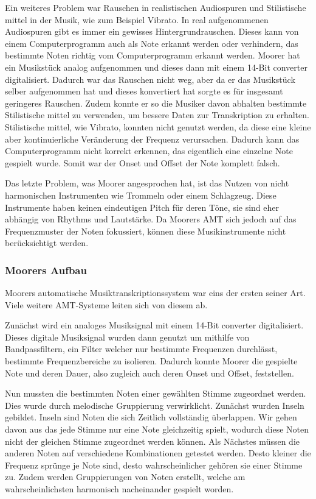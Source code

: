 Ein weiteres Problem war Rauschen in realistischen Audiospuren und
Stilistische mittel in der Musik, wie zum Beispiel Vibrato.
In real aufgenommenen Audiospuren gibt es immer ein gewisses Hintergrundrauschen.
\cite{iZotope2025noisefloor}
Dieses kann von einem Computerprogramm auch als Note erkannt werden oder verhindern, das bestimmte Noten
richtig vom Computerprogramm erkannt werden.
Moorer hat ein Musikstück analog aufgenommen und dieses dann mit einem 14-Bit converter digitalisiert.
Dadurch war das Rauschen nicht weg, aber da er das Musikstück selber aufgenommen hat und dieses konvertiert hat
sorgte es für insgesamt geringeres Rauschen.
Zudem konnte er so die Musiker davon abhalten bestimmte Stilistische mittel zu verwenden,
um bessere Daten zur Transkription zu erhalten.
Stilistische mittel, wie Vibrato, konnten nicht genutzt werden,
da diese eine kleine aber kontinuierliche Veränderung der Frequenz verursachen.
Dadurch kann das Computerprogramm nicht korrekt erkennen, das eigentlich eine einzelne Note gespielt wurde.
Somit war der Onset und Offset der Note komplett falsch.

Das letzte Problem, was Moorer angesprochen hat, ist das Nutzen von nicht
harmonischen Instrumenten wie Trommeln oder einem Schlagzeug.
Diese Instrumente haben keinen eindeutigen Pitch für deren Töne,
sie sind eher abhängig von Rhythms und Lautstärke.
Da Moorers AMT sich jedoch auf das Frequenzmuster der Noten fokussiert,
können diese Musikinstrumente nicht berücksichtigt werden.

\subsubsection{Moorers Aufbau}
Moorers automatische Musiktranskriptionssystem war eins der ersten seiner Art.
Viele weitere AMT-Systeme leiten sich von diesem ab.

Zunächst wird ein analoges Musiksignal mit einem 14-Bit converter digitalisiert.
Dieses digitale Musiksignal wurden dann genutzt um mithilfe von Bandpassfiltern,
ein Filter welcher nur bestimmte Frequenzen durchlässt,
bestimmte Frequenzbereiche zu isolieren.
Dadurch konnte Moorer die gespielte Note und deren Dauer,
also zugleich auch deren Onset und Offset, feststellen.

Nun mussten die bestimmten Noten einer gewählten Stimme zugeordnet werden.
Dies wurde durch melodische Gruppierung verwirklicht.
Zunächst wurden Inseln gebildet.
Inseln sind Noten die sich Zeitlich vollständig überlappen.
Wir gehen davon aus das jede Stimme nur eine Note gleichzeitig spielt,
wodurch diese Noten nicht der gleichen Stimme zugeordnet werden können.
Als Nächstes müssen die anderen Noten auf verschiedene Kombinationen getestet werden.
Desto kleiner die Frequenz sprünge je Note sind, desto wahrscheinlicher gehören sie einer Stimme zu.
Zudem werden Gruppierungen von Noten erstellt, welche am wahrscheinlichsten harmonisch nacheinander gespielt worden.

